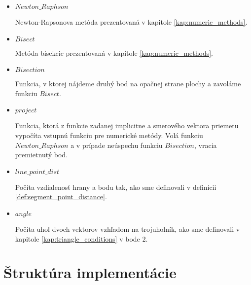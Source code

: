         \begin{itemize}
            \item{
                $Newton\_Raphson$

                Newton-Rapsonova metóda prezentovaná v kapitole \ref{kap:numeric_methods}.
            }
            \item{
                $Bisect$

                Metóda bisekcie prezentovaná v kapitole \ref{kap:numeric_methods}.
            }
            \item{
                $Bisection$

                Funkcia, v ktorej nájdeme druhý bod na opačnej strane plochy a zavoláme
                funkciu $Bisect$.
            }
            \item{
                $project$

                Funkcia, ktorá z funkcie zadanej implicitne a smerového vektora priemetu
                vypočíta vstupnú funkciu pre numerické metódy. Volá funkciu $Newton\_Raphson$
                a v prípade neúspechu funkciu $Bisection$, vracia premietnutý bod.
            }
            \item{
                $line\_point\_dist$

                Počíta vzdialenosť hrany a bodu tak, ako sme definovali v definícii 
                \ref{def:segment_point_distance}.
            }
            \item{
                $angle$

                Počíta uhol dvoch vektorov vzhľadom na trojuholník, ako sme definovali v kapitole 
                \ref{kap:triangle_conditions} v bode $2$.
            }
        \end{itemize}
\section{Štruktúra implementácie}

